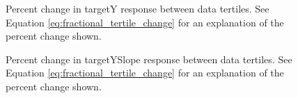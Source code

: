 \begin{landscape}
\begin{figure}[t]
\label{fig:tert_coeffXSlope}
\end{figure}
\begin{figure}[t]

\centering
{}
\caption{Percent change in targetY response between data tertiles. See Equation \ref{eq:fractional_tertile_change} for an explanation of the percent change shown.}

\label{fig:tert_coeffY}
\end{figure}

\begin{figure}[t]

\centering
{}
\caption{Percent change in targetYSlope response between data tertiles. See Equation \ref{eq:fractional_tertile_change} for an explanation of the percent change shown.}


\end{figure}
\end{landscape}
